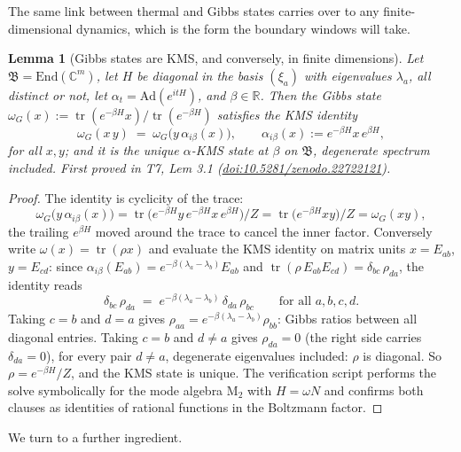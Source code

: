 \documentclass[11pt]{article}
\newtheorem{lemma}[theorem]{Lemma}
\theoremstyle{definition}
\theoremstyle{plain}
\providecommand{\C}{}\renewcommand{\C}{\mathbb{C}}
\providecommand{\End}{}\renewcommand{\End}{\mathrm{End}}
\providecommand{\Mat}{}\renewcommand{\Mat}{\mathrm{M}}
\providecommand{\R}{}\renewcommand{\R}{\mathbb{R}}
\providecommand{\tr}{}\renewcommand{\tr}{\operatorname{tr}}
\begin{document}
The same link between thermal and Gibbs states carries over to any finite-dimensional dynamics, which is the form the boundary windows will take.

\begin{lemma}[Gibbs states are KMS, and conversely, in finite dimensions]\label{c:hawking.gibbs-states-are-kms-conversely-finite}
Let $\mathfrak{B} = \End(\C^m)$, let $H$ be diagonal in the basis $(\xi_a)$ with eigenvalues $\lambda_a$, all distinct or not, let $\alpha_t = \mathrm{Ad}(e^{itH})$, and $\beta \in \R$. Then the Gibbs state $\omega_G(x) := \tr(e^{-\beta H}x)/\tr(e^{-\beta H})$ satisfies the KMS identity
\[
\omega_G(x\,y) \;=\; \omega_G\bigl(y\,\alpha_{i\beta}(x)\bigr), \qquad \alpha_{i\beta}(x) := e^{-\beta H}x\,e^{\beta H},
\]
for all $x, y$; and it is the \emph{unique} $\alpha$-KMS state at $\beta$ on $\mathfrak{B}$, degenerate spectrum included.
\emph{First proved in} T7, Lem 3.1 (\href{https://doi.org/10.5281/zenodo.22722121}{doi:10.5281/zenodo.22722121}).
\end{lemma}
\begin{proof}
The identity is cyclicity of the trace:
\[
\omega_G\bigl(y\,\alpha_{i\beta}(x)\bigr) = \tr\bigl(e^{-\beta H}y\,e^{-\beta H}x\,e^{\beta H}\bigr)/Z = \tr\bigl(e^{-\beta H}xy\bigr)/Z = \omega_G(xy),
\]
the trailing $e^{\beta H}$ moved around the trace to cancel the inner factor. Conversely write $\omega(x) = \tr(\rho x)$ and evaluate the KMS identity on matrix units $x = E_{ab}$, $y = E_{cd}$: since $\alpha_{i\beta}(E_{ab}) = e^{-\beta(\lambda_a - \lambda_b)}E_{ab}$ and $\tr(\rho\,E_{ab}E_{cd}) = \delta_{bc}\,\rho_{da}$, the identity reads
\[
\delta_{bc}\,\rho_{da} \;=\; e^{-\beta(\lambda_a - \lambda_b)}\,\delta_{da}\,\rho_{bc}
\qquad \text{for all } a, b, c, d.
\]
Taking $c = b$ and $d = a$ gives $\rho_{aa} = e^{-\beta(\lambda_a - \lambda_b)}\rho_{bb}$: Gibbs ratios between all diagonal entries. Taking $c = b$ and $d \neq a$ gives $\rho_{da} = 0$ (the right side carries $\delta_{da} = 0$), for every pair $d \neq a$, degenerate eigenvalues included: $\rho$ is diagonal. So $\rho = e^{-\beta H}/Z$, and the KMS state is unique. The verification script performs the solve symbolically for the mode algebra $\Mat_2$ with $H = \omega N$ and confirms both clauses as identities of rational functions in the Boltzmann factor.

\end{proof}

We turn to a further ingredient.
\end{document}
